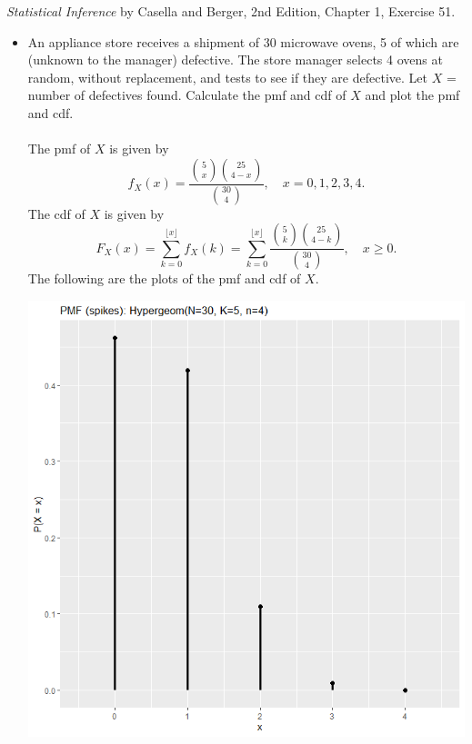 \documentclass[12pt]{article}
\newenvironment{problem}[2][Problem]{\begin{trivlist}
\item[\hskip \labelsep {\bfseries #1}\hskip \labelsep {\bfseries #2.}]}
{\end{trivlist}}
\begin{document}
\begin{problem}{7}
  \textit{Statistical Inference} by Casella and Berger, 2nd Edition, Chapter 1, 
  Exercise 51.
  \begin{itemize}
    \item[51.] An appliance store receives a shipment of 30 microwave ovens,
    5 of which are (unknown to the manager) defective. The store manager
    selects 4 ovens at random, without replacement, and tests to see if they
    are defective. Let $X$ = number of defectives found. Calculate the pmf
    and cdf of $X$ and plot the pmf and cdf.
    \\\\
    The pmf of $X$ is given by
    \[
      f_X(x) = \frac{\binom{5}{x}\binom{25}{4-x}}{\binom{30}{4}}, \quad
      x=0,1,2,3,4.
    \]
    The cdf of $X$ is given by
    \[
      F_X(x) = \sum_{k=0}^{\lfloor x \rfloor} f_X(k)
      = \sum_{k=0}^{\lfloor x \rfloor} 
      \frac{\binom{5}{k}\binom{25}{4-k}}{\binom{30}{4}},
      \quad x \geq 0.
    \]
    The following are the plots of the pmf and cdf of $X$.
    \begin{center}
      \includegraphics[width=\textwidth]{7pmf.png}

\end{center}
\end{itemize}
\end{problem}
\end{document}
